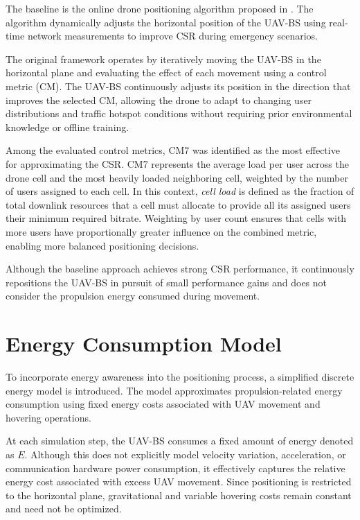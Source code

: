 \documentclass[12pt]{report}
\begin{document}
The baseline is the online drone positioning algorithm proposed in \cite{pijnappel2024online}. The algorithm dynamically adjusts the horizontal position of the UAV-BS using real-time network measurements to improve CSR during emergency scenarios.

The original framework operates by iteratively moving the UAV-BS in the horizontal plane and evaluating the effect of each movement using a control metric (CM). The UAV-BS continuously adjusts its position in the direction that improves the selected CM, allowing the drone to adapt to changing user distributions and traffic hotspot conditions without requiring prior environmental knowledge or offline training.

Among the evaluated control metrics, CM7 was identified as the most effective for approximating the CSR. CM7 represents the average load per user across the drone cell and the most heavily loaded neighboring cell, weighted by the number of users assigned to each cell. In this context, \textit{cell load} is defined as the fraction of total downlink resources that a cell must allocate to provide all its assigned users their minimum required bitrate. Weighting by user count ensures that cells with more users have proportionally greater influence on the combined metric, enabling more balanced positioning decisions.

Although the baseline approach achieves strong CSR performance, it continuously repositions the UAV-BS in pursuit of small performance gains and does not consider the propulsion energy consumed during movement.

\newpage
\section{Energy Consumption Model}

To incorporate energy awareness into the positioning process, a simplified discrete energy model is introduced. The model approximates propulsion-related energy consumption using fixed energy costs associated with UAV movement and hovering operations.

At each simulation step, the UAV-BS consumes a fixed amount of energy denoted as $E$. Although this does not explicitly model velocity variation, acceleration, or communication hardware power consumption, it effectively captures the relative energy cost associated with excess UAV movement. Since positioning is restricted to the horizontal plane, gravitational and variable hovering costs remain constant and need not be optimized.
\end{document}
